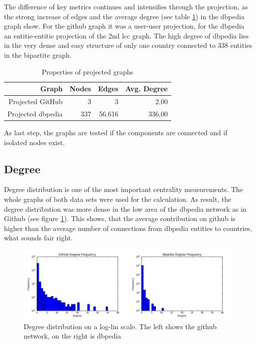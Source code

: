 \documentclass[
a4paper,     %
12pt         %
]{scrartcl}  %
\begin{document}
The difference of key metrics continues and intensifies through the projection, as the strong increase of edges and the average degree (see table \ref{tab:projected-graphs}) in the dbpedia graph show. For the github graph it was a user-user projection, for the dbpedia an entitie-entitie projection of the 2nd lcc graph. The high degree of dbpedia lies in the very dense and easy structure of only one country connected to 338 entities in the bipartite graph.

\begin{table}[h!]
  \begin{center}
    \begin{tabular}{rrrr}
      \toprule
      Graph & Nodes & Edges & Avg. Degree \\
      \midrule
             Projected GitHub & 3 & 3 & 2,00 \\
             Projected dbpedia & 337 & 56.616 & 336,00 \\
    \end{tabular}
  \end{center}
  \caption{Properties of projected graphs}
  \label{tab:projected-graphs}
\end{table}

As last step, the graphs are tested if the components are connected and if isolated nodes exist.

\subsection{Degree}
\label{sub:degree}

Degree distribution is one of the most important centrality measurements. The whole graphs of both data sets were used for the calculation. As result, the degree distribution was more dense in the low area of the dbpedia network as in Github (see figure \ref{fig:degree-centrality}). This shows, that the average contribution on github is higher than the average number of connections from dbpedia entities to countries, what sounds fair right.

\begin{figure}[h!]
  \centering
  \includegraphics[width=1\textwidth]{./images/degree-centrality.png}
  \caption{Degree distribution on a log-lin scale. The left shows the github network, on the right is dbpedia}
  \label{fig:degree-centrality}
\end{figure}
\end{document}
